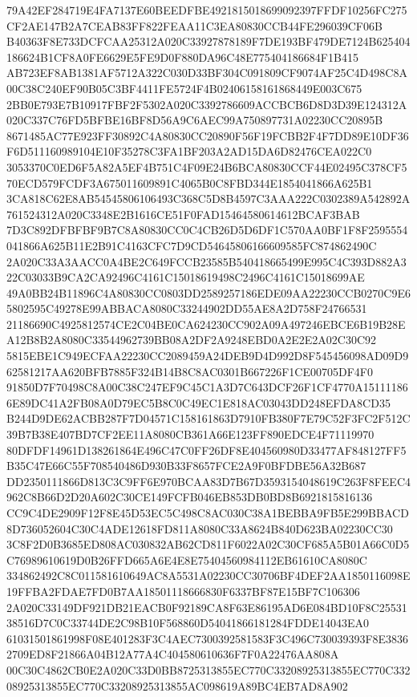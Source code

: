 \documentclass[UTF8,fontset=fandol,zihao=-4,a4paper]{ctexart}
\begin{document}
{{79A42EF284719E4FA7137E60BEEDFBE4921815018699092397FFDF10256FC275CF2AE147B2A7CEAB83FF822FEAA11C3EA80830CCB44FE296039CF06B
B40363F8E733DCFCAA25312A020C33927878189F7DE193BF479DE7124B625404186624B1CF8A0FE6629E5FE9D0F880DA96C48E775404186684F1B415
AB723EF8AB1381AF5712A322C030D33BF304C091809CF9074AF25C4D498C8A00C38C240EF90B05C3BF4411FE5724F4B02406158161868449E003C675
2BB0E793E7B10917FBF2F5302A020C3392786609ACCBCB6D8D3D39E124312A020C337C76FD5BFBE16BF8D56A9C6AEC99A750897731A02230CC20895B
8671485AC77E923FF30892C4A80830CC20890F56F19FCBB2F4F7DD89E10DF36F6D511160989104E10F35278C3FA1BF203A2AD15DA6D82476CEA022C0
3053370C0ED6F5A82A5EF4B751C4F09E24B6BCA80830CCF44E02495C378CF570ECD579FCDF3A675011609891C4065B0C8FBD344E1854041866A625B1
3CA818C62E8AB54545806106493C368C5D8B4597C3AAA222C0302389A542892A761524312A020C3348E2B1616CE51F0FAD15464580614612BCAF3BAB
7D3C892DFBFBF9B7C8A80830CC0C4CB26D5D6DF1C570AA0BF1F8F2595554041866A625B11E2B91C4163CFC7D9CD54645806166609585FC874862490C
2A020C33A3AACC0A4BE2C649FCCB23585B540418665499E995C4C393D882A322C03033B9CA2CA92496C4161C15018619498C2496C4161C15018699AE
49A0BB24B11896C4A80830CC0803DD2589257186EDE09AA22230CCB0270C9E65802595C49278E99ABBACA8080C33244902DD55AE8A2D758F24766531
21186690C4925812574CE2C04BE0CA624230CC902A09A497246EBCE6B19B28EA12B8B2A8080C33544962739BB08A2DF2A9248EBD0A2E2E2A02C30C92
5815EBE1C949ECFAA22230CC2089459A24DEB9D4D992D8F545456098AD09D962581217AA620BFB7885F324B14B8C8AC0301B667226F1CE00705DF4F0
91850D7F70498C8A00C38C247EF9C45C1A3D7C643DCF26F1CF4770A151111866E89DC41A2FB08A0D79EC5B8C0C49EC1E818AC03043DD248EFDA8CD35
B244D9DE62ACBB287F7D04571C158161863D7910FB380F7E79C52F3FC2F512C39B7B38E407BD7CF2EE11A8080CB361A66E123FF890EDCE4F71119970
80DFDF14961D138261864E496C47C0FF26DF8E404560980D33477AF848127FF5B35C47E66C55F708540486D930B33F8657FCE2A9F0BFDBE56A32B687
DD2350111866D813C3C9FF6E970BCAA83D7B67D3593154048619C263F8FEEC4962C8B66D2D20A602C30CE149FCFB046EB853DB0BD8B6921815816136
CC9C4DE2909F12F8E45D53EC5C498C8AC030C38A1BEBBA9FB5E299BBACD8D736052604C30C4ADE12618FD811A8080C33A8624B840D623BA02230CC30
3C8F2D0B3685ED808AC030832AB62CD811F6022A02C30CF685A5B01A66C0D5C76989610619D0B26FFD665A6E4E8E75404560984112EB61610CA8080C
334862492C8C011581610649AC8A5531A02230CC30706BF4DEF2AA1850116098E19FFBA2FDAE7FD0B7AA18501118666830F6337BF87E15BF7C106306
2A020C33149DF921DB21EACB0F92189CA8F63E86195AD6E084BD10F8C2553138516D7C0C33744DE2C98B10F568860D54041866181284FDDE14043EA0
61031501861998F08E401283F3C4AEC7300392581583F3C496C730039393F8E38362709ED8F21866A04B12A77A4C404580610636F7F0A22476AA808A
00C30C4862CB0E2A020C33D0BB8725313855EC770C33208925313855EC770C33208925313855EC770C33208925313855AC098619A89BC4EB7AD8A902
}}
\end{document}
